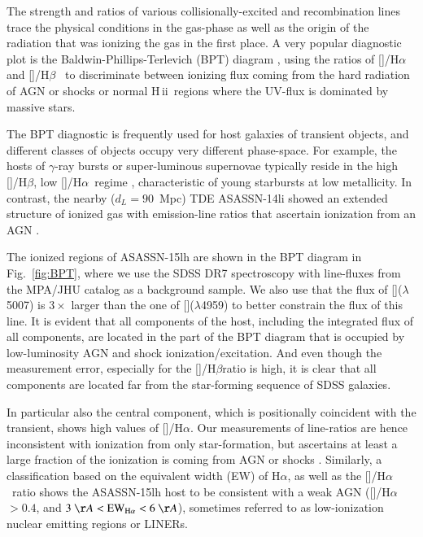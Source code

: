 \documentclass[traditabstract]{aa}
\newcommand{\hb}{H$\beta$}
\newcommand{\ha}{H$\alpha$}
\newcommand{\hii}{\mbox{H\,{\sc ii}}}
\newcommand{\oiii}{[\ion{O}{iii}]}
\newcommand{\nii}{[\ion{N}{ii}]}
\begin{document}
The strength and ratios of various collisionally-excited and recombination lines trace the physical conditions in the gas-phase as well as the origin of the radiation that was ionizing the gas in the first place. A very popular diagnostic plot is the Baldwin-Phillips-Terlevich (BPT) diagram \citep{1981PASP...93....5B}, using the ratios of \nii/\ha~ and \oiii/\hb~ to discriminate between ionizing flux coming from the hard radiation of AGN or shocks or normal \hii~regions where the UV-flux is dominated by massive stars. 

The BPT diagnostic is frequently used for host galaxies of transient objects, and different classes of objects occupy very different phase-space. For example, the hosts of $\gamma$-ray bursts or super-luminous supernovae typically reside in the high \oiii/\hb, low \nii/\ha~regime \citep{2015A&A...581A.125K, 2015MNRAS.449..917L}, characteristic of young starbursts at low metallicity. In contrast, the nearby ($d_L=90$~Mpc) TDE ASASSN-14li \citep{2016MNRAS.455.2918H} showed an extended structure of ionized gas with emission-line ratios that ascertain ionization from an AGN \citep{2016ApJ...830L..32P}.

The ionized regions of ASASSN-15lh are shown in the BPT diagram in Fig.~\ref{fig:BPT}, where we use the SDSS DR7 spectroscopy \citep{2009ApJS..182..543A} with line-fluxes from the MPA/JHU catalog as a background sample. We also use that the flux of \oiii($\lambda$5007) is $3\times$ larger than the one of \oiii($\lambda$4959) to better constrain the flux of this line. It is evident that all components of the host, including the integrated flux of all components, are located in the part of the BPT diagram that is occupied by low-luminosity AGN and shock ionization/excitation. And even though the measurement error, especially for the \oiii/\hb ratio is high,  it is clear that all components are located far from the star-forming sequence of SDSS galaxies.

In particular also the central component, which is positionally coincident with the transient, shows high values of \nii/\ha. Our measurements of line-ratios are hence inconsistent with ionization from only star-formation, but ascertains at least a large fraction of the ionization is coming from AGN or shocks \citep{2011MNRAS.413.1687C}. Similarly, a classification based on the equivalent width (EW) of \ha, as well as the \nii/\ha~ratio \citep{2011MNRAS.413.1687C} shows the ASASSN-15lh host to be consistent with a weak AGN (\nii/\ha~$>0.4$, and $3~\AA < \mathrm{EW}_{\mathrm{H}\alpha} < 6~\AA$), sometimes referred to as low-ionization nuclear emitting regions or LINERs.
\end{document}
